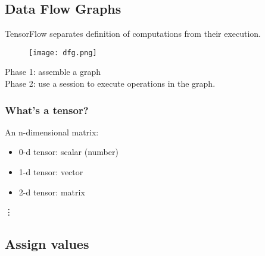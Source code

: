 \documentclass{article}
\begin{document}
	\subsection{Data Flow Graphs}
		TensorFlow separates definition of computations from their execution.
		\begin{figure}[H]
  			\centering
    		\texttt{[image: dfg.png]}
		\end{figure}
		\noindent Phase 1: assemble a graph\\
		Phase 2: use a session to execute operations in the graph.
		\subsubsection*{What's a tensor?}
		An n-dimensional matrix:
		\begin{itemize}[noitemsep,nolistsep]
			\item 0-d tensor: scalar (number)
			\item 1-d tensor: vector
			\item 2-d tensor: matrix
		\end{itemize}
		\indent\indent\indent\vdots
	\medskip
	\subsection{Assign values}
\end{document}
